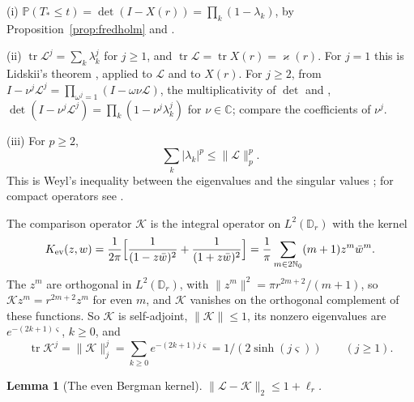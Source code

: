 \documentclass[11pt]{amsart}
\newtheorem{lemma}[theorem]{Lemma}
\theoremstyle{definition}
\theoremstyle{remark}
\numberwithin{equation}{section}
\newcommand{\C}{\mathbb{C}}
\newcommand{\N}{\mathbb{N}}
\newcommand{\D}{\mathbb{D}}
\newcommand{\PP}{\mathbb{P}}
\begin{document}
(i) $\PP(T_*\le t)=\det(I-X(r))=\prod_k(1-\lambda_k)$, by Proposition~\ref{prop:fredholm} and \cite[Theorem~14.44]{vN}.

(ii) $\operatorname{tr}\mathcal L^j=\sum_k\lambda_k^j$ for $j\ge1$, and $\operatorname{tr}\mathcal L=\operatorname{tr}X(r)=\varkappa(r)$. For $j=1$ this is Lidskii's theorem \cite[Theorem~14.34]{vN}, applied to $\mathcal L$ and to $X(r)$. For $j\ge2$, from $I-\nu^j\mathcal L^j=\prod_{\omega^j=1}(I-\omega\nu\mathcal L)$, the multiplicativity of $\det$ \cite[Lemma~14.40]{vN} and \cite[Theorem~14.44]{vN}, $\det(I-\nu^j\mathcal L^j)=\prod_k(1-\nu^j\lambda_k^j)$ for $\nu\in\C$; compare the coefficients of $\nu^j$.

(iii) For $p\ge2$,
\begin{equation}\label{eq:weyl-ineq}
\textstyle\sum_k|\lambda_k|^p\le\|\mathcal L\|_p^p .
\end{equation}
This is Weyl's inequality between the eigenvalues and the singular values \cite{We}; for compact operators see \cite[Chapter~1]{Si}.

The comparison operator $\mathcal K$ is the integral operator on $L^2(\D_r)$ with the kernel
\[
K_{\rm ev}(z,w)=\frac1{2\pi}\Bigl[\frac1{(1-z\bar w)^2}+\frac1{(1+z\bar w)^2}\Bigr]=\frac1\pi\sum_{m\in2\N_0}(m+1)z^m\bar w^m .
\]
The $z^m$ are orthogonal in $L^2(\D_r)$, with $\|z^m\|^2=\pi r^{2m+2}/(m+1)$, so $\mathcal Kz^m=r^{2m+2}z^m$ for even $m$, and $\mathcal K$ vanishes on the orthogonal complement of these functions. So $\mathcal K$ is self-adjoint, $\|\mathcal K\|\le1$, its nonzero eigenvalues are $e^{-(2k+1)\varsigma}$, $k\ge0$, and
\begin{equation}\label{eq:traces}
\operatorname{tr}\mathcal K^j=\|\mathcal K\|_j^j=\textstyle\sum_{k\ge0}e^{-(2k+1)j\varsigma}=1/(2\sinh(j\varsigma))\qquad(j\ge1).
\end{equation}

\begin{lemma}[The even Bergman kernel]\label{lem:even-bergman}
$\|\mathcal L-\mathcal K\|_2\le1+\ell_r$.
\end{lemma}
\end{document}
